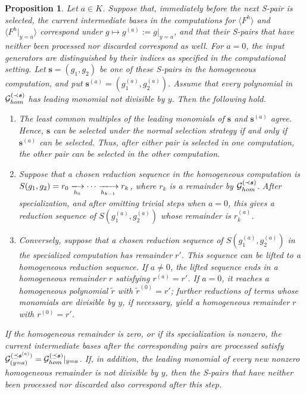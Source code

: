 \documentclass{article}
\newtheorem{proposition}[theorem]{Proposition}
\theoremstyle{definition}
\theoremstyle{plain}
\theoremstyle{plain}
\theoremstyle{plain}
\theoremstyle{plain}
\numberwithin{equation}{subsection}
\begin{document}
\begin{proposition}\label{prop:sync_partial}
Let $a\in K$.
Suppose that, immediately before the next S-pair is selected, the current intermediate bases in the computations for $\langle F^h\rangle$ and $\langle F^h|_{y=a}\rangle$ correspond under $g\mapsto g^{(a)}:=g|_{y=a}$, and that their S-pairs that have neither been processed nor discarded correspond as well.
For $a=0$, the input generators are distinguished by their indices as specified in the computational setting.
Let $\bm{s}=(g_1,g_2)$ be one of these S-pairs in the homogeneous
computation, and put $\bm{s}^{(a)}=(g_1^{(a)},g_2^{(a)})$.
Assume that every polynomial in $\mathcal{G}_{\rm hom}^{(\prec\bm{s})}$ has leading monomial not divisible by $y$.
Then the following hold.
\begin{enumerate}
    \item[(1)] The least common multiples of the leading monomials of $\bm{s}$ and $\bm{s}^{(a)}$ agree.
    Hence, $\bm{s}$ can be selected under the normal selection strategy if and only if $\bm{s}^{(a)}$ can be selected.
    Thus, after either pair is selected in one computation, the other pair can be selected in the other computation.

    \item[(2)] Suppose that a chosen reduction sequence in the homogeneous computation is $S(g_1,g_2)=r_0 \xlongrightarrow[h_0]{}\cdots \xlongrightarrow[h_{k-1}]{}r_k$, where $r_k$ is a remainder by $\mathcal{G}_{\rm hom}^{(\prec\bm{s})}$.
    After specialization, and after omitting trivial steps when $a=0$,
    this gives a reduction sequence of $S(g_1^{(a)},g_2^{(a)})$ whose remainder is $r_k^{(a)}$.

    \item[(3)]
    Conversely, suppose that a chosen reduction sequence of $S(g_1^{(a)},g_2^{(a)})$ in the specialized computation has remainder $r'$.
    This sequence can be lifted to a homogeneous reduction sequence.
    If $a\neq0$, the lifted sequence ends in a homogeneous remainder $r$ satisfying $r^{(a)}=r'$.
    If $a=0$, it reaches a homogeneous polynomial $\widetilde r$ with $\widetilde r^{(0)}=r'$; further reductions of terms whose monomials are divisible by $y$, if necessary, yield a homogeneous remainder $r$ with $r^{(0)}=r'$.
\end{enumerate}
If the homogeneous remainder is zero, or if its specialization is nonzero, the current intermediate bases after the corresponding pairs are processed satisfy $\mathcal{G}_{(y=a)}^{(\preceq\bm{s}^{(a)})}= \mathcal{G}_{\rm hom}^{(\preceq\bm{s})}|_{y=a}$.
If, in addition, the leading monomial of every new nonzero homogeneous remainder is not divisible by $y$, then the S-pairs that have neither been processed nor discarded also correspond after this step.
\end{proposition}
\end{document}
